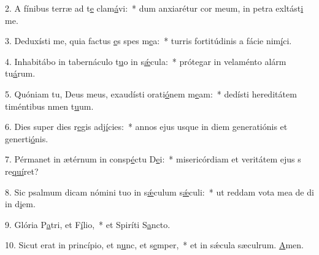 2. A fínibus terræ ad t\uline{e} clam\uline{á}vi:~* dum anxiarétur cor meum, in petra exltást\uline{i} me.\par 
3. Deduxísti me, quia factus \uline{e}s spes m\uline{e}a:~* turris fortitúdinis a fácie nim\uline{í}ci.\par 
4. Inhabitábo in tabernáculo t\uline{u}o in s\uline{ǽ}cula:~* prótegar in velaménto alárm tu\uline{á}rum.\par 
5. Quóniam tu, Deus meus, exaudísti orati\uline{ó}nem m\uline{e}am:~* dedísti hereditátem timéntibus nmen t\uline{u}um.\par 
6. Dies super dies r\uline{e}gis adj\uline{í}cies:~* annos ejus usque in diem generatiónis et generti\uline{ó}nis.\par 
7. Pérmanet in ætérnum in consp\uline{é}ctu D\uline{e}i:~* misericórdiam et veritátem ejus s re\uline{quí}ret?\par 
8. Sic psalmum dicam nómini tuo in s\uline{ǽ}culum s\uline{ǽ}culi:~* ut reddam vota mea de di in d\uline{i}em.\par 
9. Glória P\uline{a}tri, et F\uline{í}lio,~* et Spiríti S\uline{a}ncto.\par 
10. Sicut erat in princípio, et n\uline{u}nc, et s\uline{e}mper,~* et in sǽcula sæculrum. \uline{A}men.\par 
